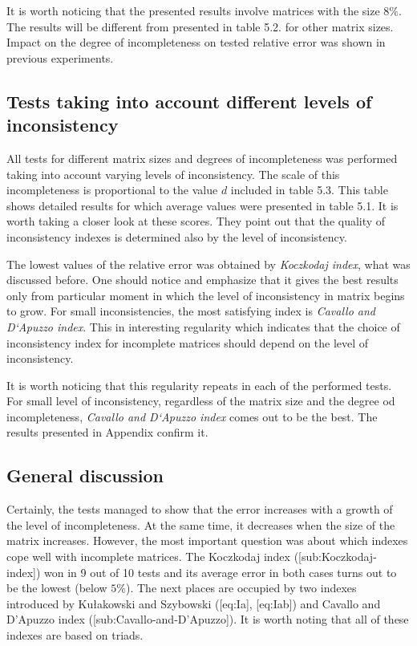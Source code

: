 It is worth noticing that the presented results involve matrices with the size $8\%$. The results will be different from presented in table 5.2. for other matrix sizes. Impact on the degree of incompleteness on tested relative error was shown in previous experiments.

\subsection{Tests taking into account different levels of inconsistency}
All tests for different matrix sizes and degrees of incompleteness was performed taking into account varying levels of inconsistency. The scale of this incompleteness is proportional to the value $d$ included in table 5.3. This table shows detailed results for which average values were presented in table 5.1. It is worth taking a closer look at these scores. They point out that the quality of inconsistency indexes is determined also by the level of inconsistency.

The lowest values of the relative error was obtained by \textit{Koczkodaj index}, what was discussed before. One should notice and emphasize that it gives the best results only from particular moment in which the level of inconsistency in matrix begins to grow. For small inconsistencies, the most satisfying index is \textit{Cavallo and D`Apuzzo index}. This in interesting regularity which indicates that the choice of inconsistency index for incomplete matrices should depend on the level of inconsistency. 

It is worth noticing that this regularity repeats in each of the performed tests. For small level of inconsistency, regardless of the matrix size and the degree od incompleteness, \textit{Cavallo and D`Apuzzo index} comes out to be the best. The results presented in Appendix confirm it.

\subsection{General discussion}
Certainly, the tests managed to show that the error increases with a growth of the level of incompleteness. At the same time, it decreases when the size of the matrix increases. However, the most important question was about which indexes cope well with incomplete matrices. The Koczkodaj index ([sub:Koczkodaj-index]) won in 9 out of 10 tests and its average error in both cases turns out to be the lowest (below $5\%$). The next places are occupied by two indexes introduced by Kułakowski and Szybowski ([eq:Ia], [eq:Iab]) and Cavallo and D'Apuzzo index ([sub:Cavallo-and-D’Apuzzo]). It is worth noting that all of these indexes are based on triads.

